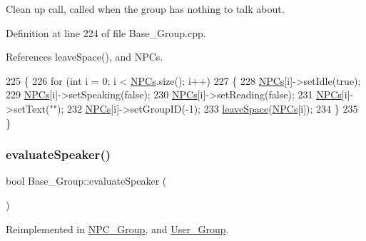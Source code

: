 Clean up call, called when the group has nothing to talk about. 



Definition at line 224 of file Base\+\_\+\+Group.\+cpp.



References leave\+Space(), and N\+P\+Cs.


\begin{DoxyCode}
225 \{
226     \textcolor{keywordflow}{for} (\textcolor{keywordtype}{int} i = 0; i < \hyperlink{class_base___group_a4757f3c06c73eea029f71b871c1d863e}{NPCs}.size(); i++)
227     \{
228         \hyperlink{class_base___group_a4757f3c06c73eea029f71b871c1d863e}{NPCs}[i]->setIdle(\textcolor{keyword}{true});
229         \hyperlink{class_base___group_a4757f3c06c73eea029f71b871c1d863e}{NPCs}[i]->setSpeaking(\textcolor{keyword}{false});
230         \hyperlink{class_base___group_a4757f3c06c73eea029f71b871c1d863e}{NPCs}[i]->setReading(\textcolor{keyword}{false});
231         \hyperlink{class_base___group_a4757f3c06c73eea029f71b871c1d863e}{NPCs}[i]->setText(\textcolor{stringliteral}{""});
232         \hyperlink{class_base___group_a4757f3c06c73eea029f71b871c1d863e}{NPCs}[i]->setGroupID(-1);
233         \hyperlink{class_base___group_a0928f2c23abc827f6d387a5597324f6e}{leaveSpace}(\hyperlink{class_base___group_a4757f3c06c73eea029f71b871c1d863e}{NPCs}[i]);
234     \}
235 \}
\end{DoxyCode}
\mbox{\label{class_base___group_a8264ff598ce7e789c6419e2e6eef08fd}} 
\subsubsection{\texorpdfstring{evaluate\+Speaker()}{evaluateSpeaker()}}
{\footnotesize\ttfamily bool Base\+\_\+\+Group\+::evaluate\+Speaker (\begin{DoxyParamCaption}{ }\end{DoxyParamCaption})\hspace{0.3cm}{\ttfamily [virtual]}}



Reimplemented in \hyperlink{class_n_p_c___group_a2e0b8772b42985bd7e87359013918601}{N\+P\+C\+\_\+\+Group}, and \hyperlink{class_user___group_a40051b822a0f0dd126b95d0f0fd28eff}{User\+\_\+\+Group}.



